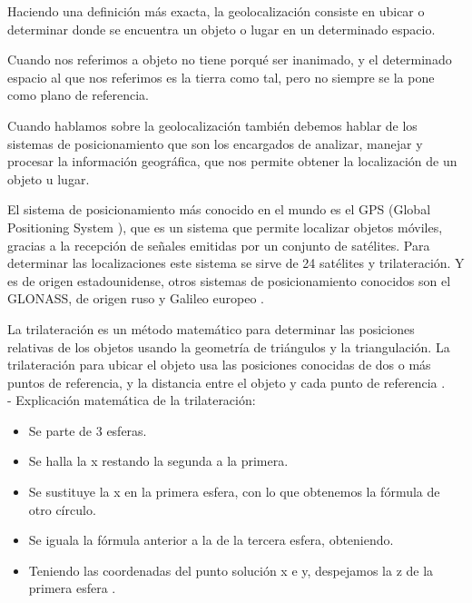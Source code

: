 Haciendo una definición más exacta, la geolocalización consiste en ubicar o determinar donde se encuentra un objeto o lugar en un determinado espacio.

Cuando nos referimos a objeto no tiene porqué ser inanimado, y el determinado espacio al que nos referimos es la tierra como tal, pero no siempre se la pone como plano de referencia. 

Cuando hablamos sobre la geolocalización también debemos hablar de los sistemas de posicionamiento que son los encargados de analizar, manejar y procesar la información geográfica, que nos permite obtener la localización de un objeto u lugar.

El sistema de posicionamiento más conocido en el mundo es el GPS (Global Positioning System ), que es un sistema que permite localizar objetos móviles, gracias a la recepción de señales emitidas por un conjunto de satélites. Para determinar las localizaciones este sistema se sirve de 24 satélites y trilateración. Y es de origen estadounidense, otros sistemas de posicionamiento conocidos son el GLONASS, de origen ruso y Galileo europeo \cite{noauthor_sistema_2017:a}.

La trilateración es un método matemático para determinar las posiciones relativas de los objetos usando la geometría de triángulos y la triangulación. La trilateración para ubicar el objeto usa las posiciones conocidas de dos o más puntos de referencia, y la distancia entre el objeto y cada punto de referencia \cite{noauthor_trilateracion_2015:a}.
\\
- Explicación matemática de la trilateración:
\begin{itemize}
\item 
	Se parte de 3 esferas.
	\\
\item
	Se halla la x restando la segunda a la primera.
\item
	Se sustituye la x en la primera esfera, con lo que obtenemos la fórmula de otro círculo.
\item
	Se iguala la fórmula anterior a la de la tercera esfera, obteniendo.
\item
	Teniendo las coordenadas del punto solución x e y, despejamos la z de la primera esfera .
\end{itemize}

